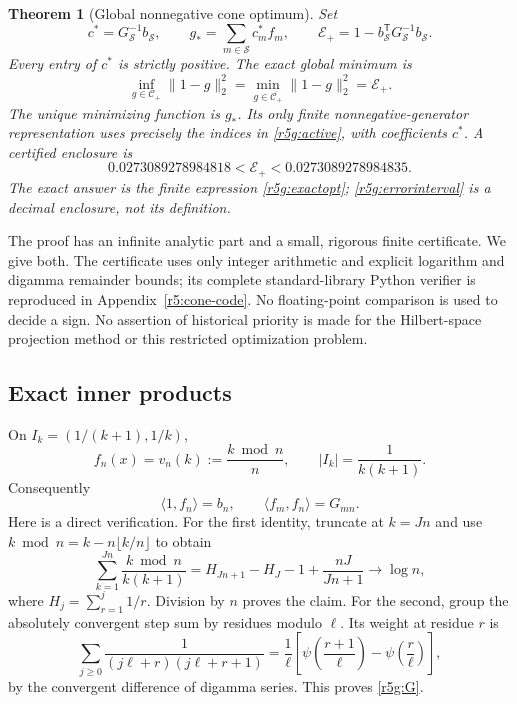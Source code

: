 \documentclass[11pt,a4paper]{article}
\newtheorem{theorem}{Theorem}[section]
\theoremstyle{definition}\newtheorem{definition}[theorem]{Definition}
\theoremstyle{remark}\newtheorem{remark}[theorem]{Remark}
\numberwithin{equation}{section}
\begin{document}
\begin{theorem}[Global nonnegative cone optimum]\label{r5g:global}
Set
\begin{equation}\label{r5g:exactopt}
 c^*=G_{\mathcal S}^{-1}b_{\mathcal S},\qquad
 g_* =\sum_{m\in\mathcal S}c_m^*f_m,\qquad
 \mathcal E_+=1-b_{\mathcal S}^{\mathsf T}
                      G_{\mathcal S}^{-1}b_{\mathcal S}.
\end{equation}
Every entry of $c^*$ is strictly positive. The exact global minimum is
\begin{equation}\label{r5g:globalmin}
 \boxed{\displaystyle
 \inf_{g\in\mathcal C_+}\|1-g\|_2^2
 =\min_{g\in\overline{\mathcal C_+}}\|1-g\|_2^2
 =\mathcal E_+.}
\end{equation}
The unique minimizing function is $g_*$. Its only finite
nonnegative-generator representation uses precisely the indices
in \eqref{r5g:active}, with coefficients $c^*$.
A certified enclosure is
\begin{equation}\label{r5g:errorinterval}
 0.0273089278984818<\mathcal E_+<0.0273089278984835.
\end{equation}
The exact answer is the finite expression \eqref{r5g:exactopt};
\eqref{r5g:errorinterval} is a decimal enclosure, not its definition.
\end{theorem}

The proof has an infinite analytic part and a small, rigorous finite
certificate. We give both. The certificate uses only integer arithmetic
and explicit logarithm and digamma remainder bounds; its complete
standard-library Python verifier is reproduced in
Appendix~\ref{r5:cone-code}. No floating-point comparison is used to
decide a sign. No assertion of historical priority is made for the
Hilbert-space projection method or this restricted optimization problem.

\subsection{Exact inner products}

On $I_k=(1/(k+1),1/k)$,
\[
 f_n(x)=v_n(k):=\frac{k\bmod n}{n},\qquad |I_k|=\frac1{k(k+1)}.
\]
Consequently
\begin{equation}\label{r5g:inners}
 \langle1,f_n\rangle=b_n,
 \qquad \langle f_m,f_n\rangle=G_{mn}.
\end{equation}
Here is a direct verification. For the first identity, truncate at
$k=Jn$ and use $k\bmod n=k-n\lfloor k/n\rfloor$ to obtain
\[
 \sum_{k=1}^{Jn}\frac{k\bmod n}{k(k+1)}
 =H_{Jn+1}-H_J-1+\frac{nJ}{Jn+1}\longrightarrow\log n,
\]
where $H_j=\sum_{r=1}^j1/r$. Division by $n$ proves the claim.
For the second, group the absolutely convergent step sum by residues
modulo $\ell$. Its weight at residue $r$ is
\[
 \sum_{j\ge0}\frac1{(j\ell+r)(j\ell+r+1)}
 =\frac1\ell\left[\psi\left(\frac{r+1}{\ell}\right)
                       -\psi\left(\frac r\ell\right)\right],
\]
by the convergent difference of digamma series. This proves
\eqref{r5g:G}.
\end{document}
